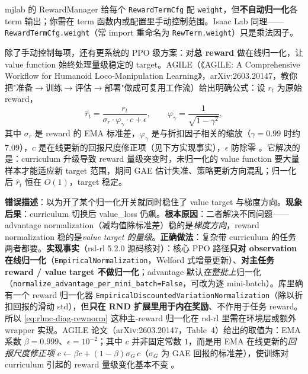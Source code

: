 mjlab 的 RewardManager 给每个 \verb|RewardTermCfg| 配 \verb|weight|，但\textbf{不自动归一化}各 term 输出；你需在 term 函数内或配置里手动控制范围。Isaac Lab 同理——\verb|RewardTermCfg.weight|（常 import 重命名为 \verb|RewTerm.weight|）只是乘法因子。

除了手动控制每项，还有更系统的 PPO 级方案：对\textbf{总 reward} 做在线归一化，让 value function 始终处理量级稳定的 target。AGILE（《AGILE: A Comprehensive Workflow for Humanoid Loco-Manipulation Learning》，arXiv:2603.20147，教你把"准备$\to$训练$\to$评估$\to$部署"做成可复用工作流）给出明确公式：设 $r_t$ 为原始 reward，
\begin{equation}
\hat{r}_t = \frac{r_t}{\sigma_r \cdot \varphi_\gamma \cdot c + \epsilon},
\qquad \varphi_\gamma = \frac{1}{\sqrt{1-\gamma^2}},
\label{eq:rlmc-diag-rewnorm}
\end{equation}
其中 $\sigma_r$ 是 reward 的 EMA 标准差，$\varphi_\gamma$ 是与折扣因子相关的缩放（$\gamma=0.99$ 时约 $7.09$），$c$ 是在线更新的回报尺度修正项（见下方实现事实），$\epsilon$ 防除零 \cite{nvidia2026agile}。它解决的是：curriculum 升级导致 reward 量级突变时，未归一化的 value function 要大量样本才能适应新 target 范围，期间 GAE 估计失准、策略更新方向混乱；归一化后 $\hat{r}_t$ 恒在 $O(1)$，target 稳定。

\begin{pitfall}
\textbf{错误描述}：以为开了某个归一化开关就同时稳住了 value target 与梯度方向。\textbf{现象后果}：curriculum 切换后 value\_loss 仍飙。\textbf{根本原因}：二者解决不同问题——advantage normalization（减均值除标准差）稳的是\emph{梯度方向}，reward normalization 稳的是\emph{value target 的量级}。\textbf{正确做法}：复杂带 curriculum 的任务两者都要。\textbf{实现事实}（rsl-rl 5.2.0 源码核对）：核心 PPO 路径\textbf{只对 observation 在线归一化}（\verb|EmpiricalNormalization|，Welford 式增量更新）、\textbf{对主任务 reward / value target 不做归一化}；advantage 默认\emph{在整批上}归一化（\verb|normalize_advantage_per_mini_batch=False|，可改为逐 mini-batch）。库里确有一个 reward 归一化器 \verb|EmpiricalDiscountedVariationNormalization|（除以折扣回报的滑动 std），但\textbf{只在 RND 扩展里用于内在奖励}、不作用于任务 reward。所以 \eqref{eq:rlmc-diag-rewnorm} 这种主-reward 归一化在 rsl-rl 里需在环境层或额外 wrapper 实现。AGILE 论文（arXiv:2603.20147，Table~4）给出的取值为：EMA 系数 $\beta=0.999$、$\epsilon=10^{-2}$；其中 $c$ 并非固定常数 $1$，而是用 EMA 在线更新的\emph{回报尺度修正项} $c\leftarrow\beta c+(1-\beta)\sigma_G\,c$（$\sigma_G$ 为 GAE 回报的标准差），使训练对 curriculum 引起的 reward 量级变化基本不变 \cite{nvidia2026agile}。
\end{pitfall}

